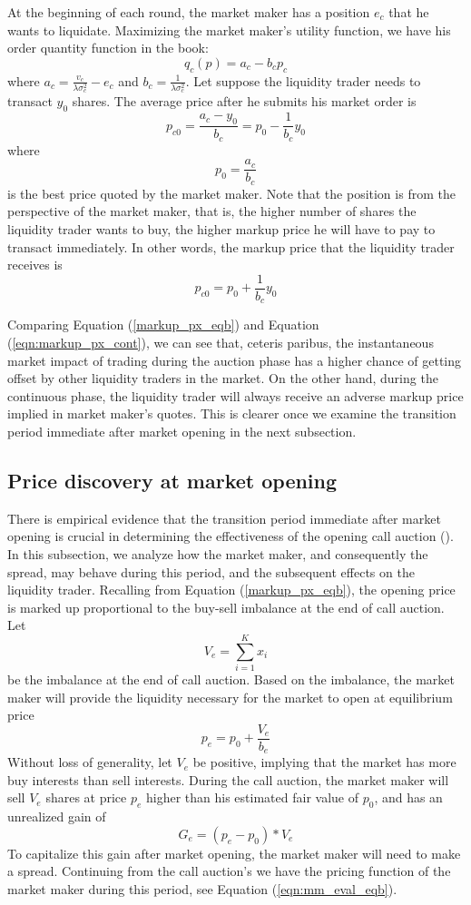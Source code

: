 At the beginning of each round, the market maker has a position $e_c$ that he wants to liquidate. Maximizing the market maker's utility function, we have his order quantity function in the book:
\begin{equation}\label{eqn:mm_eval_cont}
  q_c(p) = a_c - b_c p_c
\end{equation}
where $a_c = \frac{v_c}{\lambda \sigma_c^2} - e_c$ and $b_c=\frac{1}{\lambda \sigma_c^2}$. Let suppose the liquidity trader needs to transact $y_0$ shares. The average price after he submits his market order is
\[
  p_{c0} = \frac{a_c-y_0}{b_c} = p_0 - \frac{1}{b_c} y_0
\]
where
\[
  p_0 = \frac{a_c}{b_c}
\]
is the best price quoted by the market maker. Note that the position is from the perspective of the market maker, that is, the higher number of shares the liquidity trader wants to buy, the higher markup price he will have to pay to transact immediately. In other words, the markup price that the liquidity trader receives is
\begin{equation}\label{eqn:markup_px_cont}
  p_{c0} = p_0 + \frac{1}{b_c} y_0
\end{equation}

Comparing Equation (\ref{markup_px_eqb}) and Equation (\ref{eqn:markup_px_cont}), we can see that, ceteris paribus, the instantaneous market impact of trading during the auction phase has a higher chance of getting offset by other liquidity traders in the market. On the other hand, during the continuous phase, the liquidity trader will always receive an adverse markup price implied in market maker's quotes. This is clearer once we examine the transition period immediate after market opening in the next subsection.

\subsection{Price discovery at market opening}\label{subsec:AnalyticalFrameworkTransitionPeriod}

There is empirical evidence that the transition period immediate after market opening is crucial in determining the effectiveness of the opening call auction (\cite{Pagano2013}). In this subsection, we analyze how the market maker, and consequently the spread, may behave during this period, and the subsequent effects on the liquidity trader. Recalling from Equation (\ref{markup_px_eqb}), the opening price is marked up proportional to the buy-sell imbalance at the end of call auction. Let
\[
  V_e = \sum_{i=1}^K x_i
\]
be the imbalance at the end of call auction. Based on the imbalance, the market maker will provide the liquidity necessary for the market to open at equilibrium price
\[
  p_e = p_0 + \frac{V_e}{b_e}
\]
Without loss of generality, let $V_e$ be positive, implying that the market has more buy interests than sell interests. During the call auction, the market maker will sell $V_e$ shares at price $p_e$ higher than his estimated fair value of $p_0$, and has an unrealized gain of
\[
  G_e = (p_e - p_0) * V_e
\]
To capitalize this gain after market opening, the market maker will need to make a spread. Continuing from the call auction's we have the pricing function of the market maker during this period, see Equation (\ref{eqn:mm_eval_eqb}).

